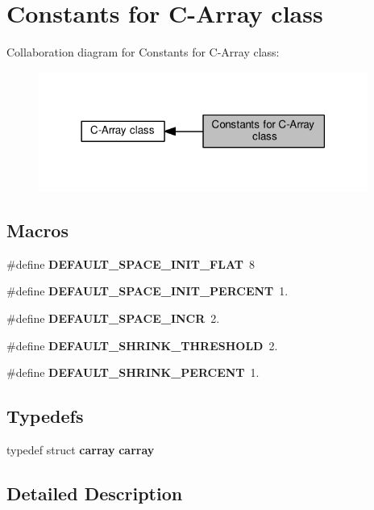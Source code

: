 \section{Constants for C-\/\+Array class}
\label{group__cst__group}
Collaboration diagram for Constants for C-\/\+Array class\+:\nopagebreak
\begin{figure}[H]
\begin{center}
\leavevmode
\includegraphics[width=306pt]{group__cst__group}
\end{center}
\end{figure}
\subsection*{Macros}
\begin{DoxyCompactItemize}
\item 
\#define {\bf D\+E\+F\+A\+U\+L\+T\+\_\+\+S\+P\+A\+C\+E\+\_\+\+I\+N\+I\+T\+\_\+\+F\+L\+AT}~8
\item 
\#define {\bf D\+E\+F\+A\+U\+L\+T\+\_\+\+S\+P\+A\+C\+E\+\_\+\+I\+N\+I\+T\+\_\+\+P\+E\+R\+C\+E\+NT}~1.
\item 
\#define {\bf D\+E\+F\+A\+U\+L\+T\+\_\+\+S\+P\+A\+C\+E\+\_\+\+I\+N\+CR}~2.
\item 
\#define {\bf D\+E\+F\+A\+U\+L\+T\+\_\+\+S\+H\+R\+I\+N\+K\+\_\+\+T\+H\+R\+E\+S\+H\+O\+LD}~2.
\item 
\#define {\bf D\+E\+F\+A\+U\+L\+T\+\_\+\+S\+H\+R\+I\+N\+K\+\_\+\+P\+E\+R\+C\+E\+NT}~1.
\end{DoxyCompactItemize}
\subsection*{Typedefs}
\begin{DoxyCompactItemize}
\item 
typedef struct {\bf carray} {\bf carray}
\end{DoxyCompactItemize}


\subsection{Detailed Description}


